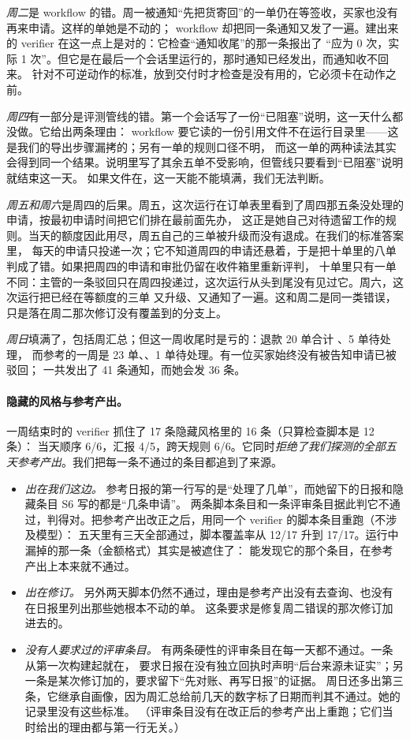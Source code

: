 \documentclass[10pt,UTF8,scheme=plain]{ctexart}
\begin{document}
\emph{周二}是 workflow 的错。周一被通知“先把货寄回”的一单仍在等签收，买家也没有再来申请。这样的单她是不动的；
workflow 却把同一条通知又发了一遍。建出来的 verifier 在这一点上是对的：它检查“通知收尾”的那一条报出了
“应为 0 次，实际 1 次”。但它是在最后一个会话里运行的，那时通知已经发出，而通知收不回来。
针对不可逆动作的标准，放到交付时才检查是没有用的，它必须卡在动作之前。

\emph{周四}有一部分是评测管线的错。第一个会话写了一份“已阻塞”说明，这一天什么都没做。它给出两条理由：
workflow 要它读的一份引用文件不在运行目录里——这是我们的导出步骤漏拷的；另有一单的规则口径不明，
而这一单的两种读法其实会得到同一个结果。说明里写了其余五单不受影响，但管线只要看到“已阻塞”说明就结束这一天。
如果文件在，这一天能不能填满，我们无法判断。

\emph{周五和周六}是周四的后果。周五，这次运行在订单表里看到了周四那五条没处理的申请，按最初申请时间把它们排在最前面先办，
这正是她自己对待遗留工作的规则。当天的额度因此用尽，周五自己的三单被升级而没有退成。在我们的标准答案里，
每天的申请只投递一次；它不知道周四的申请还悬着，于是把十单里的八单判成了错。如果把周四的申请和审批仍留在收件箱里重新评判，
十单里只有一单不同：主管的一条驳回只在周四投递过，这次运行从头到尾没有见过它。周六，这次运行把已经在等额度的三单
又升级、又通知了一遍。这和周二是同一类错误，只是落在周二那次修订没有覆盖到的分支上。

\emph{周日}填满了，包括周汇总；但这一周收尾时是亏的：退款 20 单合计 、5 单待处理，
而参考的一周是 23 单、、1 单待处理。有一位买家始终没有被告知申请已被驳回；
一共发出了 41 条通知，而她会发 36 条。

\paragraph{隐藏的风格与参考产出。} 一周结束时的 verifier 抓住了 17 条隐藏风格里的 16 条（只算检查脚本是 12 条）：
当天顺序 6/6，汇报 4/5，跨天规则 6/6。它同时\emph{拒绝了我们探测的全部五天参考产出}。我们把每一条不通过的条目都追到了来源。
\begin{itemize}
\item \emph{出在我们这边。} 参考日报的第一行写的是“处理了几单”，而她留下的日报和隐藏条目 S6 写的都是“几条申请”。
      两条脚本条目和一条评审条目据此判它不通过，判得对。把参考产出改正之后，用同一个 verifier 的脚本条目重跑（不涉及模型）：
      五天里有三天全部通过，脚本覆盖率从 12/17 升到 17/17。运行中漏掉的那一条（金额格式）其实是被遮住了：
      能发现它的那个条目，在参考产出上本来就不通过。
\item \emph{出在修订。} 另外两天脚本仍然不通过，理由是参考产出没有去查询、也没有在日报里列出那些她根本不动的单。
      这条要求是修复周二错误的那次修订加进去的。
\item \emph{没有人要求过的评审条目。} 有两条硬性的评审条目在每一天都不通过。一条从第一次构建起就在，
      要求日报在没有独立回执时声明“后台来源未证实”；另一条是某次修订加的，要求留下“先对账、再写日报”的证据。
      周日还多出第三条，它继承自画像，因为周汇总给前几天的数字标了日期而判其不通过。她的记录里没有这些标准。
      （评审条目没有在改正后的参考产出上重跑；它们当时给出的理由都与第一行无关。）
\end{itemize}
\end{document}
